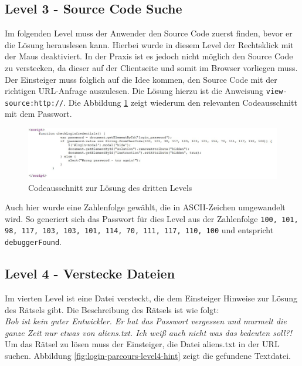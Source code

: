 \subsection{Level 3 - Source Code Suche} 
Im folgenden Level muss der Anwender den Source Code zuerst finden, bevor er die Lösung herauslesen kann. Hierbei wurde in diesem Level der Rechtsklick mit der Maus deaktiviert. In der Praxis ist es jedoch nicht möglich den Source Code zu verstecken, da dieser auf der Clientseite und somit im Browser vorliegen muss. \\ 
Der Einsteiger muss folglich auf die Idee kommen, den Source Code mit der richtigen URL-Anfrage auszulesen. Die Lösung hierzu ist die Anweisung \colorbox{altgray}{\lstinline|view-source:http://|}. Die Abbildung \ref{fig:login-parcours-level3-solution} zeigt wiederum den relevanten Codeausschnitt mit dem Passwort.

\begin{figure}[H]
	\centering
	\includegraphics[width=\textwidth]{images/LoginParcours/login_level3_solution.jpg}
	\caption{Codeausschnitt zur Lösung des dritten Levels}
	\label{fig:login-parcours-level3-solution}
\end{figure}

Auch hier wurde eine Zahlenfolge gewählt, die in ASCII-Zeichen umgewandelt wird. So generiert sich das Passwort für dies Level aus der Zahlenfolge \colorbox{altgray}{\lstinline|100, 101, 98, 117, 103, 103, 101, 114, 70, 111, 117, 110, 100|} und entspricht  \colorbox{altgray}{\lstinline|debuggerFound|}. 

\subsection{Level 4 - Verstecke Dateien}
Im vierten Level ist eine Datei versteckt, die dem Einsteiger Hinweise zur Lösung des Rätsels gibt. Die Beschreibung des Rätsels ist wie folgt: \\
\textit{Bob ist kein guter Entwickler. Er hat das Passwort vergessen und murmelt die ganze Zeit nur etwas von aliens.txt. Ich weiß auch nicht was das bedeuten soll?!}
\\
Um das Rätsel zu lösen muss der Einsteiger, die Datei aliens.txt in der URL suchen. Abbildung \ref{fig:login-parcours-level4-hint} zeigt die gefundene Textdatei. 


